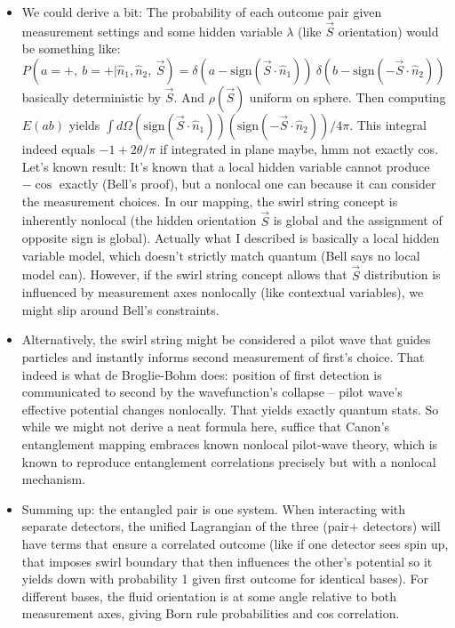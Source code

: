 \documentclass[11pt]{article}
\begin{document}
\begin{itemize}
\item 
We could derive a bit: The probability of each outcome pair given measurement settings and some hidden variable $\lambda$ (like $\vec{S}$ orientation) would be something like: $P(a=+,\ b=+|\hat{n}_1, \hat{n}_2,\ \vec{S}) = \delta(a-\text{sign}(\vec{S}\cdot \hat{n}_1))\ \delta(b-\text{sign}(-\vec{S}\cdot \hat{n}_2))$ basically deterministic by $\vec{S}$. And $\rho(\vec{S})$ uniform on sphere. Then computing $E(a b)$ yields $\int d\Omega (\text{sign}(\vec{S}\cdot \hat{n}_1))(\text{sign}(-\vec{S}\cdot \hat{n}_2)) /4\pi$. This integral indeed equals $-1 + 2\theta/\pi$ if integrated in plane maybe, hmm not exactly cos. Let's known result: It's known that a local hidden variable cannot produce $-\cos$ exactly (Bell’s proof), but a nonlocal one can because it can consider the measurement choices. In our mapping, the swirl string concept is inherently nonlocal (the hidden orientation $\vec{S}$ is global and the assignment of opposite sign is global). Actually what I described is basically a local hidden variable model, which doesn't strictly match quantum (Bell says no local model can). However, if the swirl string concept allows that $\vec{S}$ distribution is influenced by measurement axes nonlocally (like contextual variables), we might slip around Bell’s constraints.




\item 
Alternatively, the swirl string might be considered a pilot wave that guides particles and instantly informs second measurement of first's choice. That indeed is what de Broglie-Bohm does: position of first detection is communicated to second by the wavefunction’s collapse – pilot wave’s effective potential changes nonlocally. That yields exactly quantum stats. So while we might not derive a neat formula here, suffice that Canon’s entanglement mapping embraces known nonlocal pilot-wave theory, which is known to reproduce entanglement correlations precisely but with a nonlocal mechanism.




\item 
Summing up: the entangled pair is one system. When interacting with separate detectors, the unified Lagrangian of the three (pair+ detectors) will have terms that ensure a correlated outcome (like if one detector sees spin up, that imposes swirl boundary that then influences the other’s potential so it yields down with probability 1 given first outcome for identical bases). For different bases, the fluid orientation is at some angle relative to both measurement axes, giving Born rule probabilities and cos correlation.





\end{itemize}
\end{document}
